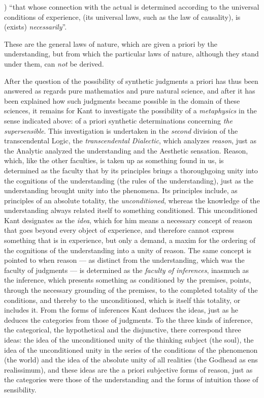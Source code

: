 ) ``that whose connection with the actual is determined according
to the universal conditions of experience, (its universal laws, such as
the law of causality), is (exists) \emph{necessarily}''.

These are the general laws of nature, which are given a priori by the
understanding, but from which the particular laws of nature, although
they stand under them, can \emph{not} be derived.

\divrule

After the question of the possibility of synthetic judgments a priori has
thus been answered as regards pure mathematics and pure natural science,
and after it has been explained how such judgments became possible in the
domain of these sciences, it remains for Kant to investigate the
possibility of a \emph{metaphysics} in the sense indicated above: of a
priori synthetic determinations concerning \emph{the supersensible}. This
investigation is undertaken in the \emph{second} division of the
transcendental Logic, the \emph{transcendental Dialectic}, which analyzes
\emph{reason},
just as the Analytic analyzed the understanding and the Aesthetic
sensation. Reason, which, like the other faculties, is taken up as
something found in us, is determined as the faculty that by its
principles brings a thoroughgoing unity into the cognitions of the
understanding (the rules of the understanding), just as the understanding
brought unity into the phenomena. Its principles include, as principles
of an absolute totality, the \emph{unconditioned}, whereas the knowledge
of the understanding always related itself to something conditioned. This
unconditioned Kant designates as the \emph{idea}, which for him means a
necessary concept of reason that goes beyond every object of experience,
and therefore cannot express something that is in experience, but only a
demand, a maxim for the ordering of the cognitions of the understanding
into a unity of reason. The same concept is pointed to when reason ---
as distinct from the understanding, which was the faculty of judgments
--- is determined as the \emph{faculty of inferences}, inasmuch as the
inference, which presents something as conditioned by the premises,
points, through the necessary grounding of the premises, to the completed
totality of the conditions, and thereby to the unconditioned, which is
itself this totality, or includes it. From the forms of inferences Kant
deduces the ideas, just as he deduces the categories from those of
judgments. To the three kinds of inference, the categorical, the
hypothetical and the disjunctive, there correspond three ideas: the idea
of the unconditioned unity of the thinking subject (the soul), the idea
of the unconditioned unity in the series of the conditions of the
phenomenon (the world) and the idea of the absolute unity of all
realities (the Godhead as ens realissimum), and these ideas are the a
priori subjective forms of reason, just as the categories were those of
the understanding and the forms of intuition those of sensibility.

